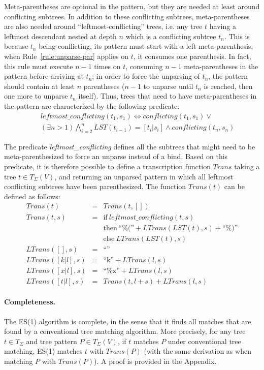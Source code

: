 \documentclass{sigplanconf}
\begin{document}
Meta-parentheses are optional in the pattern, but they are needed at
least around conflicting subtrees. In addition to these conflicting
subtrees, meta-parentheses are also needed around
``leftmost-conflicting'' trees, i.e. any tree $t$ having a leftmost
descendant nested at depth $n$ which is a conflicting subtree
$t_n$. This is because $t_n$ being conflicting, its pattern must start
with a left meta-parenthesis; when Rule~\ref{rule:unparse-par} applies
on $t$, it consumes one parenthesis. In fact, this rule must execute
$n-1$ times on $t$, consuming $n-1$ meta-parentheses in the pattern
before arriving at $t_n$; in order to force the unparsing of $t_n$,
the pattern should contain at least $n$ parentheses ($n-1$ to unparse
until $t_n$ is reached, then one more to unparse $t_n$ itself). Thus,
trees that need to have meta-parentheses in the pattern are
characterized by the following predicate:
\begin{eqnarray*}
&&\textit{leftmost\_conflicting}(t_1, s_1) \iff \textit{conflicting}(t_1,s_1) \lor \\
&&  (\exists n>1) \bigwedge_{i=2}^{n} LST(t_{i-1}) = [t_i | s_i] \land \textit{conflicting}(t_n, s_n) 
\end{eqnarray*}

The predicate \textit{leftmost\_conflicting} defines all the subtrees
that might need to be meta-parenthesized to force an unparse instead
of a bind. Based on this predicate, it is therefore possible to define
a transcription function $Trans$ taking a tree $t \in T_\Sigma(V)$,
and returning an unparsed pattern in which all leftmost conflicting
subtrees have been parenthesized. The function $Trans(t)$ can be
defined as follows:
\begin{eqnarray*}
Trans(t) &=& Trans(t, []) \\
Trans(t,s) &=& \mbox{if}\  \textit{leftmost\_conflicting}(t,s) \\
&&  \mbox{then}\ \mbox{``\%(''}+LTrans(LST(t),s)+\mbox{``\%)''} \\
&&  \mbox{else}\ LTrans(LST(t),s) \\
LTrans([],s) &=& \mbox{``''} \\
LTrans([k|l],s) &=& \mbox{``k''}+LTrans(l,s) \\
LTrans([x|l],s) &=& \mbox{``\%x''}+LTrans(l,s) \\
LTrans([t|l],s) &=& Trans(t,l+s)+LTrans(l,s)
\end{eqnarray*}

\paragraph{Completeness.}
The ES(1) algorithm is complete, in the sense that it finds all
matches that are found by a conventional tree matching algorithm.
More precisely, for any tree $t \in T_\Sigma$ and tree pattern $P \in
T_\Sigma(V)$, if $t$ matches $P$ under conventional tree matching,
ES(1) matches $t$ with $Trans(P)$ (with the same derivation as when
matching $P$ with $Trans(P)$). A proof is provided in the Appendix.
\end{document}
